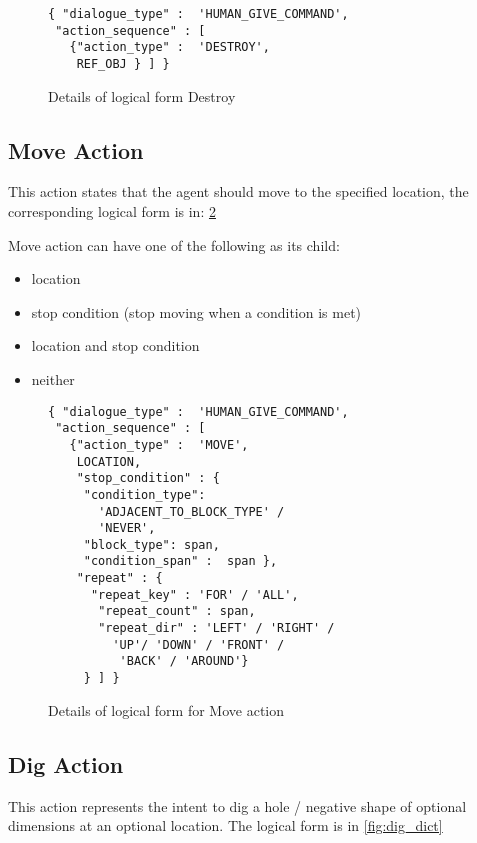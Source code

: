 \begin{figure}[ht]
    \centering
    \fontsize{8pt}{8pt}\selectfont
    \begin{verbatim}
{ "dialogue_type" :  'HUMAN_GIVE_COMMAND',
 "action_sequence" : [
   {"action_type" :  'DESTROY',
    REF_OBJ } ] }
    \end{verbatim}
    \vspace{-20pt}
    \caption{Details of logical form  Destroy}
    \vspace{-8pt}
    \label{fig:destroy_dict}
\end{figure}



\subsection{Move Action}
This action states that the agent should move to the specified location, the corresponding logical form  is in: \ref{fig:move_dict}

Move action can have one of the following as its child:
\begin{itemize}
	\setlength\itemsep{0.0em}
	\item location
	\item stop condition (stop moving when a condition is met)
	\item location and stop condition
	\item neither
\end{itemize}


\begin{figure}[ht]
    \centering
    \fontsize{8pt}{8pt}\selectfont
    \begin{verbatim}
{ "dialogue_type" :  'HUMAN_GIVE_COMMAND',
 "action_sequence" : [
   {"action_type" :  'MOVE',
    LOCATION,
    "stop_condition" : {
     "condition_type": 
       'ADJACENT_TO_BLOCK_TYPE' /
       'NEVER',
     "block_type": span,
     "condition_span" :  span },
    "repeat" : {
      "repeat_key" : 'FOR' / 'ALL',
       "repeat_count" : span,
       "repeat_dir" : 'LEFT' / 'RIGHT' / 
         'UP'/ 'DOWN' / 'FRONT' /
          'BACK' / 'AROUND'}
     } ] }

    \end{verbatim}
    \vspace{-20pt}
    \caption{Details of logical form  for Move action}
    \vspace{-8pt}
    \label{fig:move_dict}
\end{figure}

\subsection{ Dig Action}
This action represents the intent to dig a hole / negative shape of optional dimensions at an optional location. The logical form is in \ref{fig:dig_dict}

